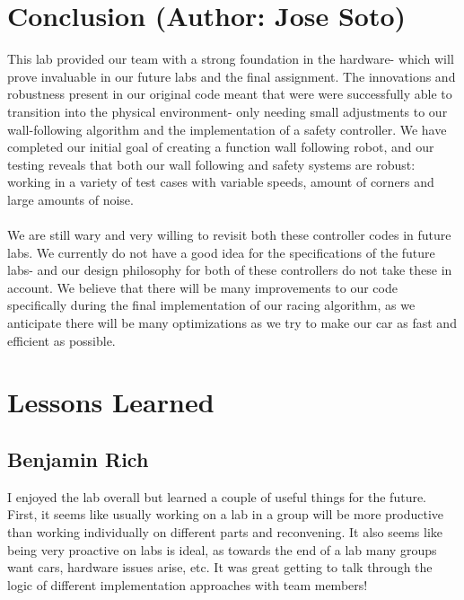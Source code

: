 \documentclass{article}
\begin{document}
\section{Conclusion (Author: Jose Soto)}
This lab provided our team with a strong foundation in the hardware- which will prove invaluable in our future labs and the final assignment. The innovations and robustness present in our original code meant that were were successfully able to transition into the physical environment- only needing small adjustments to our wall-following algorithm and the implementation of a safety controller. We have completed our initial goal of creating a function wall following robot, and our testing reveals that both our wall following and safety systems are robust: working in a variety of test cases with variable speeds, amount of corners and large amounts of noise.   \\\\
We are still wary and very willing to revisit both these controller codes in future labs. We currently do not have a good idea for the specifications of the future labs- and our design philosophy for both of these controllers do not take these in account. We believe that there will be many improvements to our code specifically during the final implementation of our racing algorithm, as we anticipate there will be many optimizations as we try to make our car as fast and efficient as possible.  




\section{Lessons Learned}

\subsection{Benjamin Rich}
I enjoyed the lab overall but learned a couple of useful things for the future. First, it seems like usually working on a lab in a group will be more productive than working individually on different parts and reconvening. It also seems like being very proactive on labs is ideal, as towards the end of a lab many groups want cars, hardware issues arise, etc. It was great getting to talk through the logic of different implementation approaches with team members!
\end{document}
